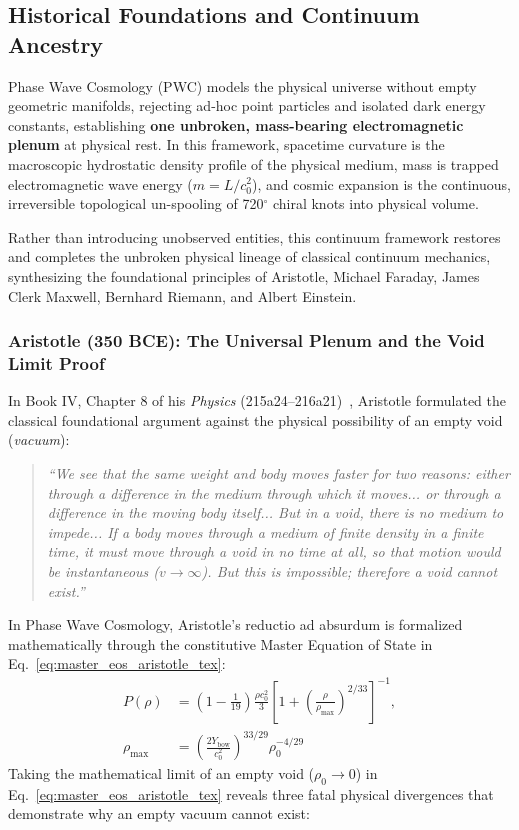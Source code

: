\documentclass[11pt,a4paper]{article}
\begin{document}
\subsection{Historical Foundations and Continuum Ancestry}
\label{subsec:continuum_ancestry}

Phase Wave Cosmology (PWC) models the physical universe without empty geometric manifolds, rejecting ad-hoc point particles and isolated dark energy constants, establishing \textbf{one unbroken, mass-bearing electromagnetic plenum} at physical rest. In this framework, spacetime curvature is the macroscopic hydrostatic density profile of the physical medium, mass is trapped electromagnetic wave energy ($m = L/c_0^2$), and cosmic expansion is the continuous, irreversible topological un-spooling of 720$^\circ$ chiral knots into physical volume.

Rather than introducing unobserved entities, this continuum framework restores and completes the unbroken physical lineage of classical continuum mechanics, synthesizing the foundational principles of Aristotle, Michael Faraday, James Clerk Maxwell, Bernhard Riemann, and Albert Einstein.

\subsubsection{Aristotle (350 BCE): The Universal Plenum and the Void Limit Proof}
\label{subsubsec:aristotle_void}

In Book IV, Chapter 8 of his \textit{Physics} (215a24--216a21)~\cite{AristotlePhysics}, Aristotle formulated the classical foundational argument against the physical possibility of an empty void (\textit{vacuum}):
\begin{quote}
\textit{``We see that the same weight and body moves faster for two reasons: either through a difference in the medium through which it moves... or through a difference in the moving body itself... But in a void, there is no medium to impede... If a body moves through a medium of finite density in a finite time, it must move through a void in no time at all, so that motion would be instantaneous ($v \to \infty$). But this is impossible; therefore a void cannot exist.''}
\end{quote}

In Phase Wave Cosmology, Aristotle's reductio ad absurdum is formalized mathematically through the constitutive Master Equation of State in Eq.~\eqref{eq:master_eos_aristotle_tex}:
\begin{equation}
\begin{aligned} P(\rho) &= \left(1 - \frac{1}{19}\right) \frac{\rho c_0^2}{3} \left[ 1 + \left( \frac{\rho}{\rho_{\max}} \right)^{2/33} \right]^{-1}, \\ \rho_{\max} &= \left( \frac{2 Y_{\text{bow}}}{c_0^2} \right)^{33/29} \rho_0^{-4/29} \end{aligned}
\label{eq:master_eos_aristotle_tex}
\end{equation}
Taking the mathematical limit of an empty void ($\rho_0 \to 0$) in Eq.~\eqref{eq:master_eos_aristotle_tex} reveals three fatal physical divergences that demonstrate why an empty vacuum cannot exist:
\end{document}
